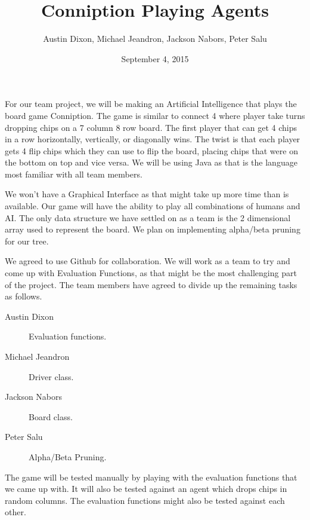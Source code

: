 \documentclass[10pt,a4paper]{article}
\author{Austin Dixon, Michael Jeandron, Jackson Nabors, Peter Salu}
\date{September 4, 2015}
\title{Conniption Playing Agents}
\begin{document}
	\maketitle
	For our team project, we will be making an Artificial Intelligence that plays the board game Conniption. The game is similar to connect 4 where player take turns dropping chips on a 7 column 8 row board. The first player that can get 4 chips in a row horizontally, vertically, or diagonally wins. The twist is that each player gets 4 flip chips which they can use to flip the board, placing chips that were on the bottom on top and vice versa. We will be using Java as that is the language most familiar with all team members.
	
	We won't have a Graphical Interface as that might take up more time than is available. Our game will have the ability to play all combinations of humans and AI. The only data structure we have settled on as a team is the 2 dimensional array used to represent the board. We plan on implementing alpha/beta pruning for our tree.
	
	We agreed to use Github for collaboration. We will work as a team to try and come up with Evaluation Functions, as that might be the most challenging part of the project. The team members have agreed to divide up the remaining tasks as follows.
	\begin{description}
		\item [Austin Dixon] Evaluation functions.
		\item[Michael Jeandron] Driver class.
		\item[Jackson Nabors] Board class.
		\item[Peter Salu] Alpha/Beta Pruning.
	\end{description}
	
	The game will be tested manually by playing with the evaluation functions that we came up with. It will also be tested against an agent which drops chips in random columns. The evaluation functions might also be tested against each other.
	
\end{document}
